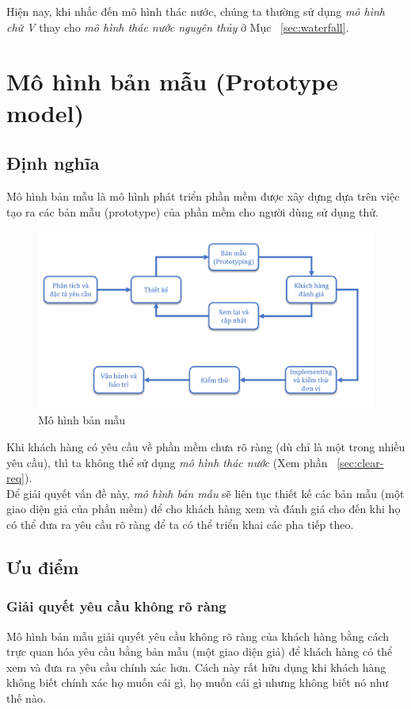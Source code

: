 \documentclass[14pt]{extarticle}
\begin{document}
Hiện nay, khi nhắc đến mô hình thác nước, chúng ta thường sử dụng \textit{mô hình chữ V}
thay cho \textit{mô hình thác nước nguyên thủy} ở Mục ~\ref{sec:waterfall}.

\newpage
\section{Mô hình bản mẫu (Prototype model)}
\subsection{Định nghĩa}
Mô hình bản mẫu là mô hình phát triển phần mềm được xây dựng
dựa trên việc tạo ra các bản mẫu (prototype) của phần mềm cho người dùng
sử dụng thử.\\

\begin{figure}[h]
  \centering
  \includegraphics[width=\textwidth]{prototype.png}
  \caption{Mô hình bản mẫu}
  \label{fig:prototype-model}
\end{figure}

Khi khách hàng có yêu cầu về phần mềm chưa rõ ràng (dù chỉ là một trong
nhiều yêu cầu), thì ta không thể sử dụng \textit{mô hình thác nước} (Xem phần ~\ref{sec:clear-req}).\\

Để giải quyết vấn đề này, \textit{mô hình bản mẫu} sẽ liên tục thiết kế các bản mẫu
(một giao diện giả của phần mềm) để cho khách hàng xem và đánh giá cho
đến khi họ có thể đưa ra yêu cầu rõ ràng để ta có thể triển khai các pha
tiếp theo.

\subsection{Ưu điểm}
\subsubsection*{Giải quyết yêu cầu không rõ ràng}
Mô hình bản mẫu giải quyết yêu cầu không rõ ràng của khách hàng
bằng cách trực quan hóa yêu cầu bằng bản mẫu (một giao diện giả)
để khách hàng có thể xem và đưa ra yêu cầu chính xác hơn.
Cách này rất hữu dụng khi khách hàng không biết chính xác họ muốn
cái gì, họ muốn cái gì nhưng không biết nó như thế nào.
\end{document}

